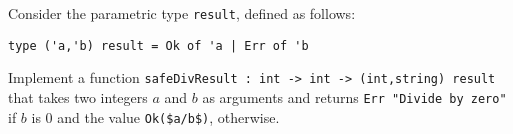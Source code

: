 Consider the parametric type \lstinline{result}, defined as follows:
\begin{lstlisting}
type ('a,'b) result = Ok of 'a | Err of 'b
\end{lstlisting}

Implement a function \lstinline{safeDivResult : int -> int -> (int,string) result} that takes two integers $a$ and $b$ as arguments and returns
\lstinline{Err "Divide by zero"} if $b$ is 0 and the value
\lstinline[mathescape]{Ok($a/b$)}, otherwise.
